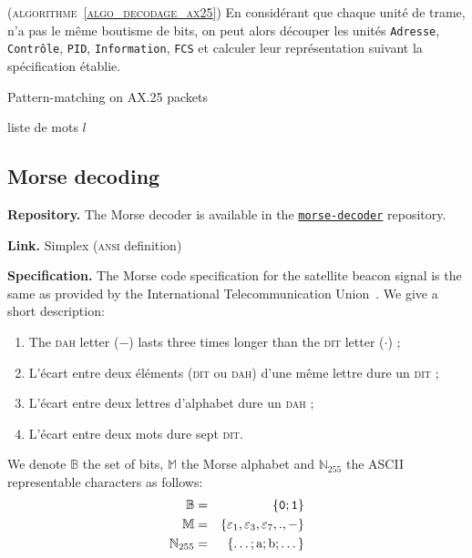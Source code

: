 \documentclass[twocolumn,pre,floats,aps,amsmath,amssymb]{revtex4}
\newenvironment{implementation}[1][Impl\'ementation.]{\begin{trivlist}
\item[\hskip \labelsep {\bfseries #1}]}{\end{trivlist}}
\newenvironment{definition}[1][D\'efinition.]{\begin{trivlist}
\item[\hskip \labelsep {\bfseries #1}]}{\end{trivlist}}
\begin{document}
\begin{implementation}
  (\textsc{algorithme~\ref{algo_decodage_ax25}})
  { \color{rltred}{\Radioactivity} }
  En consid\'erant que chaque unit\'e de trame, n'a pas le m\^eme boutisme de bits, on peut alors d\'ecouper les unit\'es \texttt{Adresse}, \texttt{Contr\^ole}, \texttt{PID}, \texttt{Information}, \texttt{FCS} et calculer leur repr\'esentation suivant la sp\'ecification \'etablie.
\end{implementation}

\begin{algorithm}[h]
\caption{Pattern-matching on AX.25 packets}
\label{algo_decodage_ax25}
\begin{algorithmic}[1]
  \REQUIRE liste de mots $l$
\end{algorithmic}
\end{algorithm}


\subsection{Morse decoding}

\textbf{Repository.} The Morse decoder is available in the \href{https://github.com/EmptyStackExn/morse-decoder}{\texttt{morse-decoder}} repository.

\textbf{Link.} Simplex (\textsc{ansi} definition)

\vspace{0.3cm}

\textbf{Specification.}
The Morse code specification for the satellite beacon signal is the same as provided by the International Telecommunication Union~\cite{ITU_morse}. We give a short description:

\begin{enumerate}
  \item{The \textsc{dah} letter ($-$) lasts three times longer than the \textsc{dit} letter ($\cdot$) ;}
  \item{L'\'ecart entre deux \'el\'ements (\textsc{dit} ou \textsc{dah}) d'une m\^eme lettre dure un \textsc{dit} ;}
  \item{L'\'ecart entre deux lettres d'alphabet dure un \textsc{dah} ;}
  \item{L'\'ecart entre deux mots dure sept \textsc{dit}.}
\end{enumerate}

\begin{definition}
  We denote $\mathbb{B}$ the set of bits, $\mathbb{M}$ the Morse alphabet and $\mathbb{N}_{255}$ the ASCII representable characters as follows:
  \begin{eqnarray*}
    \mathbb{B}      &=& \left \{ \texttt{0} ; \texttt{1} \right \}\\
    \mathbb{M}      &=& \left \{ \varepsilon_1, \varepsilon_3, \varepsilon_7, ., - \right \}\\
    \mathbb{N}_{255} &=& \left \{ \dots ; \textup{a} ; \textup{b} ; \dots \right \}
  \end{eqnarray*}
\end{definition}
\end{document}
